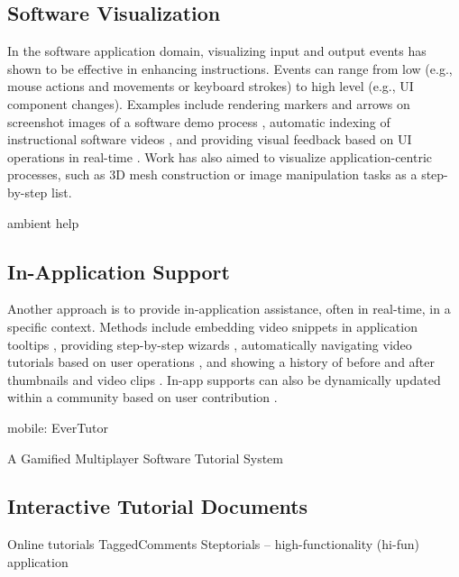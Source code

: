 \subsection{Software Visualization}

In the software application domain, visualizing input and output events has shown to be effective in enhancing instructions. Events can range from low (e.g., mouse actions and movements or keyboard strokes) to high level (e.g., UI component changes). Examples include rendering markers and arrows on screenshot images of a software demo process \cite{Nakamura:2008:ASV:1449715.1449721, Grabler:2009jj}, automatic indexing of instructional software videos \cite{Banovic:2012kd}, and providing visual feedback based on UI operations in real-time \cite{Dixon:2010fb,Dixon:2011:CHP:1978942.1979086}. Work has also aimed to visualize application-centric processes, such as 3D mesh construction \cite{Denning:2011fy} or image manipulation tasks \cite{Grabler:2009jj} as a step-by-step list.

ambient help \cite{Matejka:2011:AH:1978942.1979349}

\subsection{In-Application Support}

Another approach is to provide in-application assistance, often in real-time, in a specific context. Methods include embedding video snippets in application tooltips \cite{Grossman:2010wr}, providing step-by-step wizards \cite{Bergman:2005:DocWizards,Kelleher:2005:STD:1054972.1055047,Fernquist:2011:SRE:2047196.2047245}, automatically navigating video tutorials based on user operations \cite{Pongnumkul:2011ju}, and showing a history of before and after thumbnails and video clips \cite{Grossman:2010jz}. In-app supports can also be dynamically updated within a community based on user contribution \cite{Lafreniere:2013ff,Matejka:2009:CCR:1622176.1622214}.

mobile: EverTutor \cite{Wang:2014:EAC:2556288.2557407}

A Gamified Multiplayer Software Tutorial System \cite{Li:2014:CGM:2556288.2556954}

\subsection{Interactive Tutorial Documents}

Online tutorials
TaggedComments \cite{Bunt:2014:TPI:2556288.2557118}
Steptorials \cite{Lieberman:2014:SML:2557500.2557543} -- high-functionality (hi-fun) application

